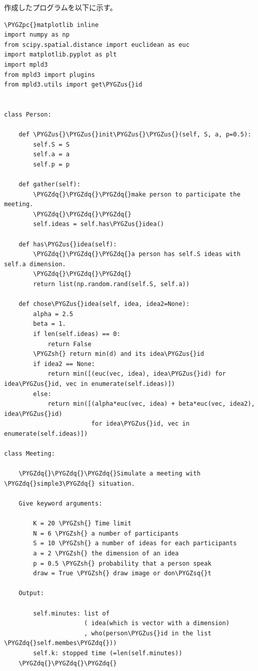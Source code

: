 \documentclass[letterpaper,10pt,english]{sphinxmanual}
\def\PYGZus{\char`\_}
\def\PYGZsh{\char`\#}
\def\PYGZpc{\char`\%}
\def\PYGZsq{\char`\'}
\def\PYGZdq{\char`\"}
\begin{document}
作成したプログラムを以下に示す。

\begin{Verbatim}[commandchars=\\\{\}]
\PYGZpc{}matplotlib inline
import numpy as np
from scipy.spatial.distance import euclidean as euc
import matplotlib.pyplot as plt
import mpld3
from mpld3 import plugins
from mpld3.utils import get\PYGZus{}id


class Person:

    def \PYGZus{}\PYGZus{}init\PYGZus{}\PYGZus{}(self, S, a, p=0.5):
        self.S = S
        self.a = a
        self.p = p

    def gather(self):
        \PYGZdq{}\PYGZdq{}\PYGZdq{}make person to participate the meeting.
        \PYGZdq{}\PYGZdq{}\PYGZdq{}
        self.ideas = self.has\PYGZus{}idea()

    def has\PYGZus{}idea(self):
        \PYGZdq{}\PYGZdq{}\PYGZdq{}a person has self.S ideas with self.a dimension.
        \PYGZdq{}\PYGZdq{}\PYGZdq{}
        return list(np.random.rand(self.S, self.a))

    def chose\PYGZus{}idea(self, idea, idea2=None):
        alpha = 2.5
        beta = 1.
        if len(self.ideas) == 0:
            return False
        \PYGZsh{} return min(d) and its idea\PYGZus{}id
        if idea2 == None:
            return min([(euc(vec, idea), idea\PYGZus{}id) for idea\PYGZus{}id, vec in enumerate(self.ideas)])
        else:
            return min([(alpha*euc(vec, idea) + beta*euc(vec, idea2), idea\PYGZus{}id)
                        for idea\PYGZus{}id, vec in enumerate(self.ideas)])

class Meeting:

    \PYGZdq{}\PYGZdq{}\PYGZdq{}Simulate a meeting with \PYGZdq{}simple3\PYGZdq{} situation.

    Give keyword arguments:

        K = 20 \PYGZsh{} Time limit
        N = 6 \PYGZsh{} a number of participants
        S = 10 \PYGZsh{} a number of ideas for each participants
        a = 2 \PYGZsh{} the dimension of an idea
        p = 0.5 \PYGZsh{} probability that a person speak
        draw = True \PYGZsh{} draw image or don\PYGZsq{}t

    Output:

        self.minutes: list of
                      ( idea(which is vector with a dimension)
                      , who(person\PYGZus{}id in the list \PYGZdq{}self.membes\PYGZdq{}))
        self.k: stopped time (=len(self.minutes))
    \PYGZdq{}\PYGZdq{}\PYGZdq{}


\end{Verbatim}
\end{document}
